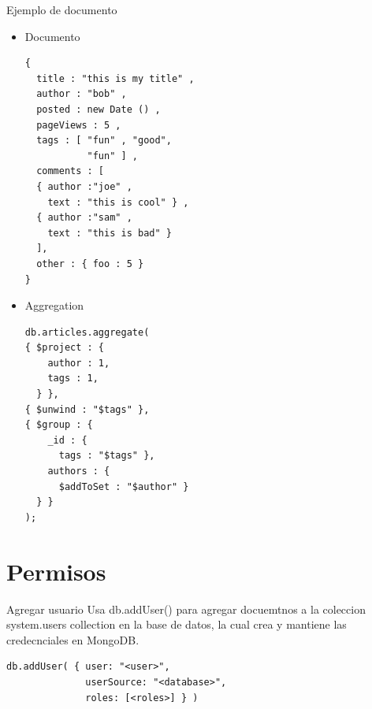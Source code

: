 \documentclass[12pt]{beamer}
\begin{document}
\begin{frame}[fragile]{Ejemplo de documento}
  \begin{multicols}{2}
    \begin{itemize}
  \item Documento
    \begin{verbatim}
{
  title : "this is my title" ,
  author : "bob" ,
  posted : new Date () ,
  pageViews : 5 ,
  tags : [ "fun" , "good", 
           "fun" ] ,
  comments : [
  { author :"joe" , 
    text : "this is cool" } ,
  { author :"sam" , 
    text : "this is bad" }
  ],
  other : { foo : 5 }
}
   \end{verbatim}

 \item Aggregation
     \begin{verbatim}
db.articles.aggregate(
{ $project : {
    author : 1,
    tags : 1,
  } },
{ $unwind : "$tags" },
{ $group : {
    _id : { 
      tags : "$tags" },
    authors : { 
      $addToSet : "$author" }
  } }
);
\end{verbatim} 
      
    \end{itemize}
  \end{multicols}
\end{frame}


\section{Permisos}
\begin{frame}[fragile]{Agregar usuario}
Usa db.addUser() para agregar docuemtnos a la coleccion system.users collection en la base de datos, la cual crea y mantiene las credecnciales en MongoDB.

\begin{verbatim}
db.addUser( { user: "<user>", 
              userSource: "<database>", 
              roles: [<roles>] } )
\end{verbatim}
\end{frame}
\end{document}
